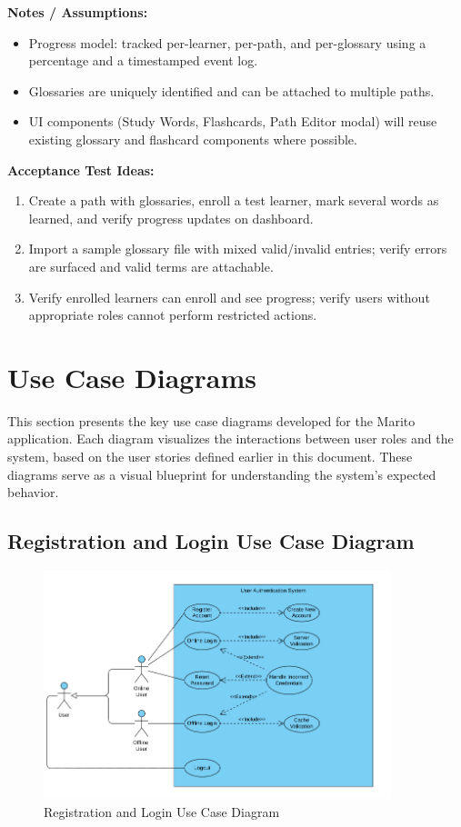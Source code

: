 \documentclass[12pt]{article}
\begin{document}
\vspace{1em}
\textbf{Notes / Assumptions:}
\begin{itemize}
    \item Progress model: tracked per-learner, per-path, and per-glossary using a percentage and a timestamped event log.
    \item Glossaries are uniquely identified and can be attached to multiple paths.
    \item UI components (Study Words, Flashcards, Path Editor modal) will reuse existing glossary and flashcard components where possible.
\end{itemize}

\vspace{1em}
\textbf{Acceptance Test Ideas:}
\begin{enumerate}
    \item Create a path with glossaries, enroll a test learner, mark several words as learned, and verify progress updates on dashboard.
    \item Import a sample glossary file with mixed valid/invalid entries; verify errors are surfaced and valid terms are attachable.
    \item Verify enrolled learners can enroll and see progress; verify users without appropriate roles cannot perform restricted actions.
\end{enumerate}


\section{Use Case Diagrams}

This section presents the key use case diagrams developed for the Marito application. Each diagram visualizes the interactions between user roles and the system, based on the user stories defined earlier in this document. These diagrams serve as a visual blueprint for understanding the system's expected behavior.

\subsection{Registration and Login Use Case Diagram}
\begin{figure}[H]
  \centering
  \includegraphics[width=0.9\textwidth]{registration_login.png}
  \caption{Registration and Login Use Case Diagram}
  \label{fig:reg-log-use-case}
\end{figure}
\end{document}
